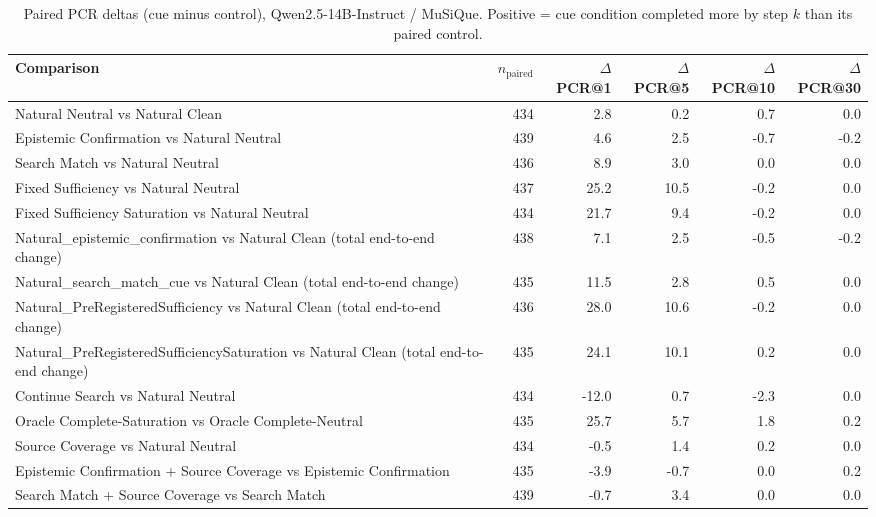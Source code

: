 \begin{table}[t]
\centering
\caption{Paired PCR deltas (cue minus control), Qwen2.5-14B-Instruct / MuSiQue. Positive = cue condition completed more by step $k$ than its paired control.}
\begin{tabular}{lrrrrr}
\toprule
Comparison & $n_{\text{paired}}$ & $\Delta$PCR@1 & $\Delta$PCR@5 & $\Delta$PCR@10 & $\Delta$PCR@30 \\
\midrule
Natural Neutral vs Natural Clean & 434 & 2.8 & 0.2 & 0.7 & 0.0 \\
Epistemic Confirmation vs Natural Neutral & 439 & 4.6 & 2.5 & -0.7 & -0.2 \\
Search Match vs Natural Neutral & 436 & 8.9 & 3.0 & 0.0 & 0.0 \\
Fixed Sufficiency vs Natural Neutral & 437 & 25.2 & 10.5 & -0.2 & 0.0 \\
Fixed Sufficiency Saturation vs Natural Neutral & 434 & 21.7 & 9.4 & -0.2 & 0.0 \\
Natural\_epistemic\_confirmation vs Natural Clean (total end-to-end change) & 438 & 7.1 & 2.5 & -0.5 & -0.2 \\
Natural\_search\_match\_cue vs Natural Clean (total end-to-end change) & 435 & 11.5 & 2.8 & 0.5 & 0.0 \\
Natural\_PreRegisteredSufficiency vs Natural Clean (total end-to-end change) & 436 & 28.0 & 10.6 & -0.2 & 0.0 \\
Natural\_PreRegisteredSufficiencySaturation vs Natural Clean (total end-to-end change) & 435 & 24.1 & 10.1 & 0.2 & 0.0 \\
Continue Search vs Natural Neutral & 434 & -12.0 & 0.7 & -2.3 & 0.0 \\
Oracle Complete-Saturation vs Oracle Complete-Neutral & 435 & 25.7 & 5.7 & 1.8 & 0.2 \\
Source Coverage vs Natural Neutral & 434 & -0.5 & 1.4 & 0.2 & 0.0 \\
Epistemic Confirmation + Source Coverage vs Epistemic Confirmation & 435 & -3.9 & -0.7 & 0.0 & 0.2 \\
Search Match + Source Coverage vs Search Match & 439 & -0.7 & 3.4 & 0.0 & 0.0 \\
\bottomrule
\end{tabular}
\end{table}

